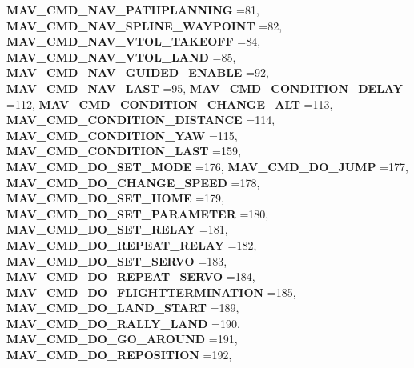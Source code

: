 \begin{DoxyCompactItemize}
\newline
\textbf{ M\+A\+V\+\_\+\+C\+M\+D\+\_\+\+N\+A\+V\+\_\+\+P\+A\+T\+H\+P\+L\+A\+N\+N\+I\+NG} =81, 
\textbf{ M\+A\+V\+\_\+\+C\+M\+D\+\_\+\+N\+A\+V\+\_\+\+S\+P\+L\+I\+N\+E\+\_\+\+W\+A\+Y\+P\+O\+I\+NT} =82, 
\textbf{ M\+A\+V\+\_\+\+C\+M\+D\+\_\+\+N\+A\+V\+\_\+\+V\+T\+O\+L\+\_\+\+T\+A\+K\+E\+O\+FF} =84, 
\textbf{ M\+A\+V\+\_\+\+C\+M\+D\+\_\+\+N\+A\+V\+\_\+\+V\+T\+O\+L\+\_\+\+L\+A\+ND} =85, 
\newline
\textbf{ M\+A\+V\+\_\+\+C\+M\+D\+\_\+\+N\+A\+V\+\_\+\+G\+U\+I\+D\+E\+D\+\_\+\+E\+N\+A\+B\+LE} =92, 
\textbf{ M\+A\+V\+\_\+\+C\+M\+D\+\_\+\+N\+A\+V\+\_\+\+L\+A\+ST} =95, 
\textbf{ M\+A\+V\+\_\+\+C\+M\+D\+\_\+\+C\+O\+N\+D\+I\+T\+I\+O\+N\+\_\+\+D\+E\+L\+AY} =112, 
\textbf{ M\+A\+V\+\_\+\+C\+M\+D\+\_\+\+C\+O\+N\+D\+I\+T\+I\+O\+N\+\_\+\+C\+H\+A\+N\+G\+E\+\_\+\+A\+LT} =113, 
\newline
\textbf{ M\+A\+V\+\_\+\+C\+M\+D\+\_\+\+C\+O\+N\+D\+I\+T\+I\+O\+N\+\_\+\+D\+I\+S\+T\+A\+N\+CE} =114, 
\textbf{ M\+A\+V\+\_\+\+C\+M\+D\+\_\+\+C\+O\+N\+D\+I\+T\+I\+O\+N\+\_\+\+Y\+AW} =115, 
\textbf{ M\+A\+V\+\_\+\+C\+M\+D\+\_\+\+C\+O\+N\+D\+I\+T\+I\+O\+N\+\_\+\+L\+A\+ST} =159, 
\textbf{ M\+A\+V\+\_\+\+C\+M\+D\+\_\+\+D\+O\+\_\+\+S\+E\+T\+\_\+\+M\+O\+DE} =176, 
\newline
\textbf{ M\+A\+V\+\_\+\+C\+M\+D\+\_\+\+D\+O\+\_\+\+J\+U\+MP} =177, 
\textbf{ M\+A\+V\+\_\+\+C\+M\+D\+\_\+\+D\+O\+\_\+\+C\+H\+A\+N\+G\+E\+\_\+\+S\+P\+E\+ED} =178, 
\textbf{ M\+A\+V\+\_\+\+C\+M\+D\+\_\+\+D\+O\+\_\+\+S\+E\+T\+\_\+\+H\+O\+ME} =179, 
\textbf{ M\+A\+V\+\_\+\+C\+M\+D\+\_\+\+D\+O\+\_\+\+S\+E\+T\+\_\+\+P\+A\+R\+A\+M\+E\+T\+ER} =180, 
\newline
\textbf{ M\+A\+V\+\_\+\+C\+M\+D\+\_\+\+D\+O\+\_\+\+S\+E\+T\+\_\+\+R\+E\+L\+AY} =181, 
\textbf{ M\+A\+V\+\_\+\+C\+M\+D\+\_\+\+D\+O\+\_\+\+R\+E\+P\+E\+A\+T\+\_\+\+R\+E\+L\+AY} =182, 
\textbf{ M\+A\+V\+\_\+\+C\+M\+D\+\_\+\+D\+O\+\_\+\+S\+E\+T\+\_\+\+S\+E\+R\+VO} =183, 
\textbf{ M\+A\+V\+\_\+\+C\+M\+D\+\_\+\+D\+O\+\_\+\+R\+E\+P\+E\+A\+T\+\_\+\+S\+E\+R\+VO} =184, 
\newline
\textbf{ M\+A\+V\+\_\+\+C\+M\+D\+\_\+\+D\+O\+\_\+\+F\+L\+I\+G\+H\+T\+T\+E\+R\+M\+I\+N\+A\+T\+I\+ON} =185, 
\textbf{ M\+A\+V\+\_\+\+C\+M\+D\+\_\+\+D\+O\+\_\+\+L\+A\+N\+D\+\_\+\+S\+T\+A\+RT} =189, 
\textbf{ M\+A\+V\+\_\+\+C\+M\+D\+\_\+\+D\+O\+\_\+\+R\+A\+L\+L\+Y\+\_\+\+L\+A\+ND} =190, 
\textbf{ M\+A\+V\+\_\+\+C\+M\+D\+\_\+\+D\+O\+\_\+\+G\+O\+\_\+\+A\+R\+O\+U\+ND} =191, 
\newline
\textbf{ M\+A\+V\+\_\+\+C\+M\+D\+\_\+\+D\+O\+\_\+\+R\+E\+P\+O\+S\+I\+T\+I\+ON} =192, 

\end{DoxyCompactItemize}
